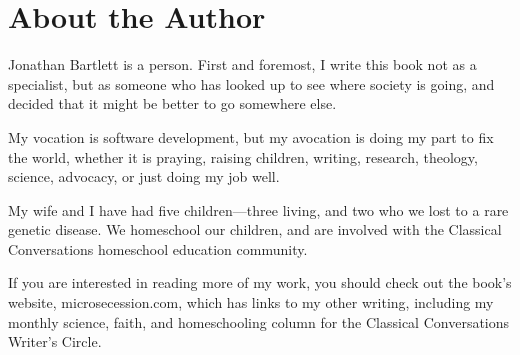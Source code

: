 \chapter*{About the Author}

Jonathan Bartlett is a person.  First and foremost, I write this book not
as a specialist, but as someone who has looked up to see where society is 
going, and decided that it might be better to go somewhere else.  

My vocation is software development, but my avocation is doing my part
to fix the world, whether it is praying, raising children, writing, research,
theology, science, advocacy, or just doing my job well.

My wife and I have had five children---three living, and two who we lost
to a rare genetic disease.  We homeschool our children, and are involved
with the Classical Conversations homeschool education community.

If you are interested in reading more of my work, you should check out
the book's website, microsecession.com, which has links to my other
writing, including my monthly science, faith, and homeschooling column 
for the Classical Conversations Writer's Circle.
